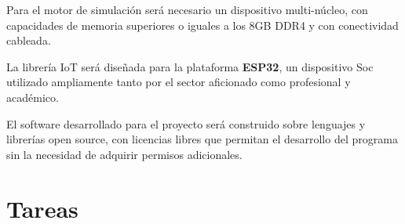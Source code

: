 Para el motor de simulación será necesario un dispositivo multi-núcleo, con
capacidades de memoria superiores o iguales a los 8GB DDR4 y con
conectividad cableada.

La librería IoT será diseñada para la plataforma \textbf{ESP32}, un dispositivo Soc utilizado ampliamente tanto por el sector aficionado como profesional y académico.

El software desarrollado para el proyecto será
construido sobre lenguajes y librerías open source, con licencias libres que
permitan el desarrollo del programa sin la necesidad de adquirir permisos
adicionales.

\section{Tareas}
\renewcommand{\arraystretch}{1.2}
